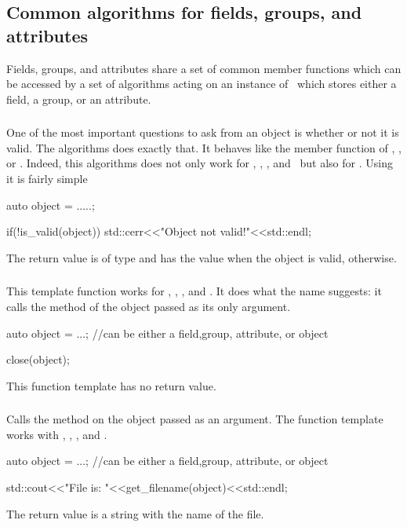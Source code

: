 \subsection{Common algorithms for fields, groups, and attributes}

Fields, groups, and attributes share a set of common member functions which can
be accessed by a set of algorithms acting on an instance of \nxobject\ which 
stores either a field, a group, or an attribute. 

\subsubsection{}

One of the most important questions to ask from an object is whether or not it
is valid. The  algorithms does exactly that. It behaves like 
the  member function of \nxgroup, \nxfield, or \nxattribute. 
Indeed, this algorithms does not only work for \nxobject, \nxgroup, \nxfield,
and \nxattribute\ but also for \nxfile. Using it is fairly simple 
\begin{cppcode}
auto object = .....; 

if(!is_valid(object))
    std::cerr<<"Object not valid!"<<std::endl;
\end{cppcode}
The return value is of type  and has the value  when the
object is valid,  otherwise.

\subsubsection{}

This template function works for \nxgroup, \nxfield, \nxattribute, and
\nxobject. It does what the name suggests: it calls the  method of
the object passed as its only argument. 
\begin{cppcode}
auto object = ...; //can be either a field,group, attribute, or object

close(object);
\end{cppcode}
This function template has no return value.

\subsubsection{}

Calls the  method on the object passed as an argument. The
function template works with \nxobject, \nxfield, \nxgroup, and \nxattribute. 
\begin{cppcode}
auto object = ...; //can be either a field,group, attribute, or object

std::cout<<"File is: "<<get_filename(object)<<std::endl;
\end{cppcode}
The return value is a string with the name of the file.

